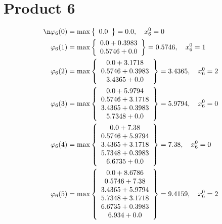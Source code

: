 \documentclass{article}
\begin{document}
\section{Product 6}
\begin{align*}
\n  
  
\varphi_{6}(0) &= \max \left\{ \begin{array}{c}
0.0
\end{array} \right\}=0.0,\quad x_{6}^0=0\\
  
  
  
  
\varphi_{6}(1) &= \max \left\{ \begin{array}{c}
0.0 + 0.3983 \\
 0.5746 + 0.0
\end{array} \right\}=0.5746,\quad x_{6}^0=1\\
  
  
  
  
\varphi_{6}(2) &= \max \left\{ \begin{array}{c}
0.0 + 3.1718 \\
 0.5746 + 0.3983 \\
 3.4365 + 0.0
\end{array} \right\}=3.4365,\quad x_{6}^0=2\\
  
  
  
  
\varphi_{6}(3) &= \max \left\{ \begin{array}{c}
0.0 + 5.9794 \\
 0.5746 + 3.1718 \\
 3.4365 + 0.3983 \\
 5.7348 + 0.0
\end{array} \right\}=5.9794,\quad x_{6}^0=0\\
  
  
  
  
\varphi_{6}(4) &= \max \left\{ \begin{array}{c}
0.0 + 7.38 \\
 0.5746 + 5.9794 \\
 3.4365 + 3.1718 \\
 5.7348 + 0.3983 \\
 6.6735 + 0.0
\end{array} \right\}=7.38,\quad x_{6}^0=0\\
  
  
  
  
\varphi_{6}(5) &= \max \left\{ \begin{array}{c}
0.0 + 8.6786 \\
 0.5746 + 7.38 \\
 3.4365 + 5.9794 \\
 5.7348 + 3.1718 \\
 6.6735 + 0.3983 \\
 6.934 + 0.0
\end{array} \right\}=9.4159,\quad x_{6}^0=2\\
  

\end{align*}
\end{document}
